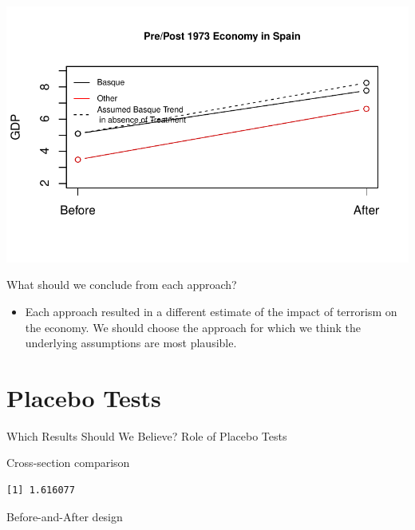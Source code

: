 \documentclass[
  letterpaper,
  DIV=11,
  numbers=noendperiod]{scrreprt}
\newenvironment{Shaded}{\begin{snugshade}}{\end{snugshade}}
\newcommand{\DocumentationTok}[1]{\textcolor[rgb]{0.37,0.37,0.37}{\textit{#1}}}
\newcommand{\FunctionTok}[1]{\textcolor[rgb]{0.28,0.35,0.67}{#1}}
\newcommand{\NormalTok}[1]{\textcolor[rgb]{0.00,0.23,0.31}{#1}}
\newcommand{\SpecialCharTok}[1]{\textcolor[rgb]{0.37,0.37,0.37}{#1}}
\providecommand{\tightlist}{%
  \setlength{\itemsep}{0pt}\setlength{\parskip}{0pt}}\usepackage{longtable,booktabs,array}
\begin{document}
\includegraphics{05-Causalityii_files/figure-pdf/unnamed-chunk-29-1.pdf}

What should we conclude from each approach?

\begin{itemize}
\tightlist
\item
  Each approach resulted in a different estimate of the impact of
  terrorism on the economy. We should choose the approach for which we
  think the underlying assumptions are most plausible.
\end{itemize}

\hypertarget{placebo-tests}{%
\section{Placebo Tests}\label{placebo-tests}}

Which Results Should We Believe? Role of Placebo Tests

Cross-section comparison

\begin{Shaded}
\end{Shaded}

\begin{verbatim}
[1] 1.616077
\end{verbatim}

Before-and-After design
\end{document}
